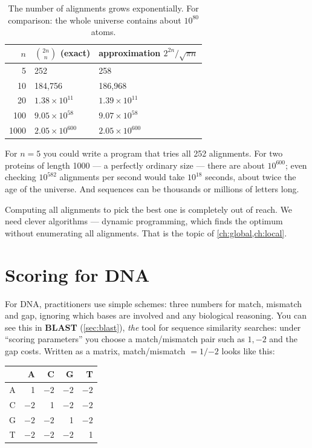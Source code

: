 \documentclass[11pt, oneside]{book}
\let\originalsection\section
\renewcommand{\section}{\Needspace{7\baselineskip}\originalsection}
\begin{document}
\begin{table}[htbp]
\centering
\small
\begin{tabular}{@{}rll@{}}
\toprule
$n$ & $\binom{2n}{n}$ (exact) & approximation $2^{2n}/\sqrt{\pi n}$ \\
\midrule
5    & 252                       & 258 \\
10   & 184{,}756                 & 186{,}968 \\
20   & $1.38 \times 10^{11}$     & $1.39 \times 10^{11}$ \\
100  & $9.05 \times 10^{58}$     & $9.07 \times 10^{58}$ \\
1000 & $2.05 \times 10^{600}$    & $2.05 \times 10^{600}$ \\
\bottomrule
\end{tabular}
\caption{The number of alignments grows exponentially. For comparison: the
whole universe contains about $10^{80}$ atoms.}
\label{tab:num-alignments}
\end{table}

For $n = 5$ you could write a program that tries all 252 alignments. For two
proteins of length 1000 --- a perfectly ordinary size --- there are about
$10^{600}$; even checking $10^{582}$ alignments per second would take
$10^{18}$ seconds, about twice the age of the universe. And sequences can be
thousands or millions of letters long.

\begin{notebox}[title={Brute force is out of the question}]
Computing all alignments to pick the best one is completely out of reach. We
need clever algorithms --- dynamic programming, which finds the optimum
without enumerating all alignments. That is the topic of
\cref{ch:global,ch:local}.
\end{notebox}

\section{Scoring for DNA}

For DNA, practitioners use simple schemes: three numbers for match, mismatch
and gap, ignoring which bases are involved and any biological reasoning. You
can see this in \textbf{BLAST} (\cref{sec:blast}), \emph{the} tool for
sequence similarity searches: under ``scoring parameters'' you choose a
match/mismatch pair such as $1, -2$ and the gap costs. Written as a matrix,
match/mismatch $= 1/{-2}$ looks like this:

\begin{center}
\small
\begin{tabular}{@{}c|rrrr@{}}
 & A & C & G & T \\
\midrule
A & 1 & $-2$ & $-2$ & $-2$ \\
C & $-2$ & 1 & $-2$ & $-2$ \\
G & $-2$ & $-2$ & 1 & $-2$ \\
T & $-2$ & $-2$ & $-2$ & 1 \\
\end{tabular}
\end{center}
\end{document}
